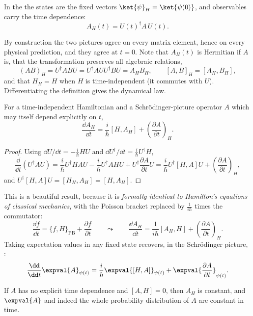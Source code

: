 \begin{definition}
    In the  the states are the fixed vectors $\ket{\psi}_H = \ket{\psi(0)}$, and observables carry the time dependence:
    $$
    A_H(t) = U(t)^\dagger A \, U(t).
    $$
\end{definition}

By construction the two pictures agree on every matrix element, hence on every physical prediction, and they agree at $t=0$. Note that $A_H(t)$ is Hermitian if $A$ is, that the transformation preserves all algebraic relations,
$$
(AB)_H = U^\dagger A B U = U^\dagger A U U^\dagger B U = A_H B_H, \qquad [A,B]_H = [A_H, B_H],
$$
and that $H_H = H$ when $H$ is time-independent (it commutes with $U$). Differentiating the definition gives the dynamical law.

\begin{theorem}
    For a time-independent Hamiltonian and a Schr\"odinger-picture operator $A$ which may itself depend explicitly on $t$,
    $$
    \frac{\dd A_H}{\dd t} = \frac{i}{\hbar}\left[ H, A_H \right] + \left( \frac{\partial A}{\partial t} \right)_{\!H}.
    $$
\end{theorem}
\begin{proof}
    Using $\dd U/\dd t = -\frac{i}{\hbar}HU$ and $\dd U^\dagger/\dd t = \frac{i}{\hbar}U^\dagger H$,
    $$
    \frac{\dd}{\dd t}\left( U^\dagger A U \right) = \frac{i}{\hbar}U^\dagger H A U - \frac{i}{\hbar} U^\dagger A H U + U^\dagger \frac{\partial A}{\partial t} U = \frac{i}{\hbar}U^\dagger[H,A]U + \left(\frac{\partial A}{\partial t}\right)_H,
    $$
    and $U^\dagger[H,A]U = [H_H, A_H] = [H,A_H]$. \qedhere
\end{proof}

This is a beautiful result, because it is \emph{formally identical to Hamilton's equations of classical mechanics}, with the Poisson bracket replaced by $\frac{1}{i\hbar}$ times the commutator:
$$
\frac{\dd f}{\dd t} = \{f, H\}_{\mathrm{PB}} + \frac{\partial f}{\partial t} \qquad \leadsto \qquad \frac{\dd A_H}{\dd t} = \frac{1}{i\hbar}[A_H, H] + \left(\frac{\partial A}{\partial t}\right)_H.
$$
Taking expectation values in any fixed state recovers, in the Schr\"odinger picture, :
$$
\frac{\dd}{\dd t}\expval{A}_{\psi(t)} = \frac{i}{\hbar}\expval{[H,A]}_{\psi(t)} + \expval{\frac{\partial A}{\partial t}}_{\psi(t)}.
$$

\begin{corollary}
    If $A$ has no explicit time dependence and $[A, H] = 0$, then $A_H$ is constant, and $\expval{A}$ and indeed the whole probability distribution of $A$ are constant in time.
\end{corollary}

